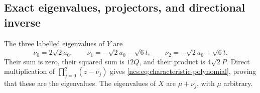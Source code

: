 \documentclass[11pt]{article}
\theoremstyle{definition}
\begin{document}
\subsection{Exact eigenvalues, projectors, and directional inverse}
\label{ncs:sec:projectors}

The three labelled eigenvalues of $Y$ are
\begin{equation}
 \nu_0=2\sqrt2a_0,\qquad
 \nu_1=-\sqrt2a_0-\sqrt6t,\qquad
 \nu_2=-\sqrt2a_0+\sqrt6t.
 \label{ncs:eq:labelled-eigenvalues}\tag{NCS9}
\end{equation}
Their sum is zero, their squared sum is $12Q$, and their product
is $4\sqrt2P$. Direct multiplication of
$\prod_{j=0}^2(z-\nu_j)$ gives
\eqref{ncs:eq:characteristic-polynomial}, proving that these are
the eigenvalues. The eigenvalues of $X$ are $\mu+\nu_j$, with
$\mu$ arbitrary.
\end{document}
